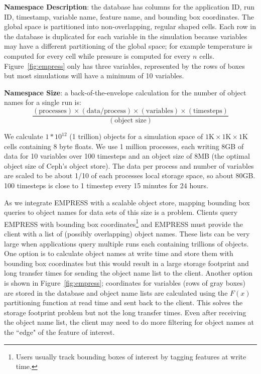 \textbf{Namespace Description}: the database has columns for the application
ID, run ID, timestamp, variable name, feature name, and bounding box
coordinates.  The global space is partitioned into non-overlapping, regular
shaped cells.  Each row in the database is duplicated for each variable in the
simulation because variables may have a different partitioning of the global
space; for example temperature is computed for every cell while pressure is
computed for every \(n\) cells.  Figure~\ref{fig:empress} only has three
variables, represented by the rows of boxes but most simulations will have a
minimum of 10 variables.

\textbf{Namespace Size}: a back-of-the-envelope calculation for the number of
object names for a single run is:
\vspace{-0.5em}
\[\frac
  {(\text{processes})\times
   (\text{data/process})\times
   (\text{variables})\times
   (\text{timesteps})}
  {(\text{object size})}
\]
\vspace{-0.5em}

We calculate \(1*10^{12}\) (1 trillion) objects for a simulation space of
\(1\text{K}\times1\text{K}\times1\text{K}\) cells containing 8 byte floats.  We
use 1 million processes, each writing 8GB of data for 10 variables over 100
timesteps and an object size of 8MB (the optimal object size of Ceph's object
store).  The data per process and number of variables are scaled to be about
1/10 of each processes local storage space, so about 80GB. 100 timesteps is
close to 1 timestep every 15 minutes for 24 hours. 

As we integrate EMPRESS with a scalable object store, mapping bounding box
queries to object names for data sets of this size is a problem. Clients query
EMPRESS with bounding box coordinates\footnote{Users usually track bounding
boxes of interest by tagging features at write time.} and EMPRESS must provide
the client with a list of (possibly overlapping) object names.  These lists can
be very large when applications query multiple runs each containing trillions
of objects.  One option is to calculate object names at write time and store
them with bounding box coordinates but this would result in a large storage
footprint and long transfer times for sending the object name list to the
client.  Another option is shown in Figure~\ref{fig:empress}; coordinates for
variables (rows of gray boxes) are stored in the database and object name lists
are calculated using the \(F(x)\) partitioning function at read time and sent
back to the client. This solves the storage footprint problem but not the long
transfer times.  Even after receiving the object name list, the client may need
to do more filtering for object names at the ``edge" of the feature of
interest.

